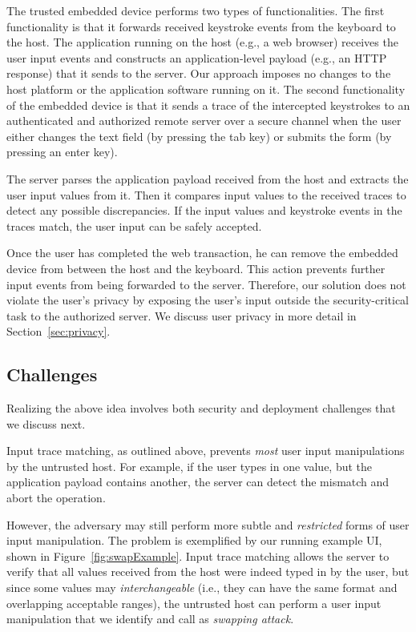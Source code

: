 The trusted embedded device performs two types of functionalities. The first functionality is that it forwards received keystroke events from the keyboard to the host. The application running on the host (e.g., a web browser) receives the user input events and constructs an application-level payload (e.g., an HTTP response) that it sends to the server. Our approach imposes no changes to the host platform or the application software running on it. The second functionality of the embedded device is that it sends a trace of the intercepted keystrokes to an authenticated and authorized remote server over a secure channel when the user either changes the text field (by pressing the tab key) or submits the form (by pressing an enter key).

The server parses the application payload received from the host and extracts the user input values from it. Then it compares input values to the received traces to detect any possible discrepancies. If the input values and keystroke events in the traces match, the user input can be safely accepted.

Once the user has completed the web transaction, he can remove the embedded device from between the host and the keyboard. This action prevents further input events from being forwarded to the server. Therefore, our solution does not violate the user's privacy by exposing the user's input outside the security-critical task to the authorized server. We discuss user privacy in more detail in Section~\ref{sec:privacy}.

\subsection{Challenges}
\label{sec:ourApproach:challenges}

Realizing the above idea involves both security and deployment challenges that we discuss next.

 Input trace matching, as outlined above, prevents \emph{most} user input manipulations by the untrusted host. For example, if the user types in one value, but the application payload contains another, the server can detect the mismatch and abort the operation. 

However, the adversary may still perform more subtle and \emph{restricted} forms of user input manipulation.
The problem is exemplified by our running example UI, shown in Figure~\ref{fig:swapExample}. Input trace matching allows the server to verify that all values received from the host were indeed typed in by the user, but since some values may \emph{interchangeable} (i.e., they can have the same format and overlapping acceptable ranges), the untrusted host can perform a user input manipulation that we identify and call as \emph{swapping attack}.

